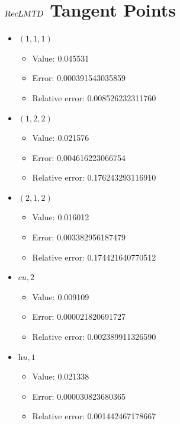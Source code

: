 \documentclass{article}%
\begin{document}
\section{$\textsl{RecLMTD}$ Tangent Points}%
\thispagestyle{plain}%
\begin{itemize}%
	\item $(1, 1, 1)$%
	\begin{itemize}%
		\item Value: 0.045531%
		\item Error: 0.000391543035859%
		\item Relative error: 0.008526232311760%
	\end{itemize}%
	\item $(1, 2, 2)$%
	\begin{itemize}%
		\item Value: 0.021576%
		\item Error: 0.004616223066754%
		\item Relative error: 0.176243293116910%
	\end{itemize}%
	\item $(2, 1, 2)$%
	\begin{itemize}%
		\item Value: 0.016012%
		\item Error: 0.003382956187479%
		\item Relative error: 0.174421640770512%
	\end{itemize}%
	\item $\textit{cu},2$%
	\begin{itemize}%
		\item Value: 0.009109%
		\item Error: 0.000021820691727%
		\item Relative error: 0.002389911326590%
	\end{itemize}%
	\item $\textit{hu},1$%
	\begin{itemize}%
		\item Value: 0.021338%
		\item Error: 0.000030823680365%
		\item Relative error: 0.001442467178667%
	\end{itemize}%
\end{itemize}%
\end{document}
